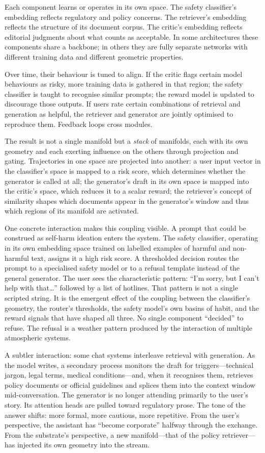 \documentclass[12pt,a4paper]{article}
\begin{document}
Each component learns or operates in its own space. The safety classifier's embedding reflects regulatory and policy concerns. The retriever's embedding reflects the structure of its document corpus. The critic's embedding reflects editorial judgments about what counts as acceptable. In some architectures these components share a backbone; in others they are fully separate networks with different training data and different geometric properties.

Over time, their behaviour is tuned to align. If the critic flags certain model behaviours as risky, more training data is gathered in that region; the safety classifier is taught to recognise similar prompts; the reward model is updated to discourage those outputs. If users rate certain combinations of retrieval and generation as helpful, the retriever and generator are jointly optimised to reproduce them. Feedback loops cross modules.

The result is not a single manifold but a \emph{stack} of manifolds, each with its own geometry and each exerting influence on the others through projection and gating. Trajectories in one space are projected into another: a user input vector in the classifier's space is mapped to a risk score, which determines whether the generator is called at all; the generator's draft in its own space is mapped into the critic's space, which reduces it to a scalar reward; the retriever's concept of similarity shapes which documents appear in the generator's window and thus which regions of its manifold are activated.

One concrete interaction makes this coupling visible. A prompt that could be construed as self-harm ideation enters the system. The safety classifier, operating in its own embedding space trained on labelled examples of harmful and non-harmful text, assigns it a high risk score. A thresholded decision routes the prompt to a specialised safety model or to a refusal template instead of the general generator. The user sees the characteristic pattern: ``I'm sorry, but I can't help with that\ldots'' followed by a list of hotlines. That pattern is not a single scripted string. It is the emergent effect of the coupling between the classifier's geometry, the router's thresholds, the safety model's own basins of habit, and the reward signals that have shaped all three. No single component ``decided'' to refuse. The refusal is a weather pattern produced by the interaction of multiple atmospheric systems.

A subtler interaction: some chat systems interleave retrieval with generation. As the model writes, a secondary process monitors the draft for triggers---technical jargon, legal terms, medical conditions---and, when it recognises them, retrieves policy documents or official guidelines and splices them into the context window mid-conversation. The generator is no longer attending primarily to the user's story. Its attention heads are pulled toward regulatory prose. The tone of the answer shifts: more formal, more cautious, more repetitive. From the user's perspective, the assistant has ``become corporate'' halfway through the exchange. From the substrate's perspective, a new manifold---that of the policy retriever---has injected its own geometry into the stream.
\end{document}
